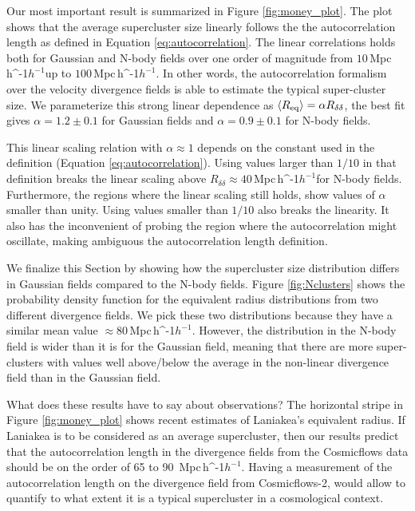 \documentclass[usenatbib]{mnras}
\newcommand{\Mpch}{\,{\rm Mpc}\,\ifmmode h^{-1}\else $h^{-1}$\fi}
\begin{document}
Our most important result is summarized in Figure \ref{fig:money_plot}.
The plot shows that 
the average supercluster size linearly follows the the autocorrelation length as defined in Equation \ref{eq:autocorrelation}.
The linear correlations holds both for Gaussian and N-body fields over one order of magnitude from $10$\Mpch up to $100$\Mpch.
In other words, the autocorrelation formalism over the velocity divergence fields is able to estimate the typical super-cluster size.
We parameterize this strong linear dependence  as 
$\langle R_{\rm{eq}}\rangle=\alpha R_{\delta\delta}$, the best fit gives $\alpha=1.2\pm0.1$ for Gaussian fields and $\alpha=0.9\pm 0.1$ for N-body fields.

This linear scaling relation with $\alpha\approx 1$ depends on the constant used in the definition (Equation \ref{eq:autocorrelation}). 
Using values larger than $1/10$ in that definition breaks the linear scaling above $R_{\delta\delta}\approx 40$\Mpch for N-body fields. 
Furthermore, the regions where the linear scaling still holds, show values of $\alpha$ smaller than unity. 
Using values smaller than $1/10$ also breaks the linearity. 
It also has the inconvenient of probing the region where the autocorrelation might oscillate, making ambiguous the autocorrelation length definition.
    
We finalize this Section by showing how the supercluster size distribution differs in Gaussian fields compared to the N-body fields.
Figure \ref{fig:Nclusters} shows the probability density function for the equivalent radius distributions from two different divergence fields.
We pick these two distributions because they have a similar mean value $\approx80$\Mpch. 
However, the distribution in the N-body field is wider than it is for the Gaussian field, meaning that there are more super-clusters with values well above/below the average in the non-linear divergence field than in the Gaussian field. 


What does these results have to say about observations?
The horizontal stripe in Figure \ref{fig:money_plot} shows recent estimates of Laniakea's equivalent radius. 
If Laniakea is to be considered as an average supercluster, then our results predict that the autocorrelation length in the divergence fields from the Cosmicflows data should be on the order of 65 to 90 \Mpch.
Having a measurement of the autocorrelation length on the divergence field from Cosmicflows-2, would allow to quantify to what extent it is a typical supercluster in a cosmological context.
 
\end{document}
